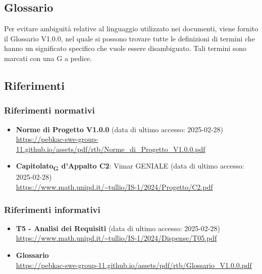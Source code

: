 \subsection{Glossario}
Per evitare ambiguità relative al linguaggio utilizzato nei documenti, viene fornito il Glossario V1.0.0, nel quale si possono trovare tutte le definizioni di termini che hanno un significato specifico che vuole essere disambiguato. Tali termini sono marcati con una G a pedice.
\subsection{Riferimenti}
\subsubsection{Riferimenti  normativi}  
\begin{itemize}
    \item \textbf{Norme di Progetto V1.0.0} (data di ultimo accesso: 2025-02-28)\\
    \url{https://pebkac-swe-group-11.github.io/assets/pdf/rtb/Norme_di_Progetto_V1.0.0.pdf} 

    \item \textbf{Capitolato\textsubscript{G} d'Appalto C2}: Vimar GENIALE (data di ultimo accesso: 2025-02-28)\\
    \url{https://www.math.unipd.it/~tullio/IS-1/2024/Progetto/C2.pdf}
\end{itemize}
\subsubsection{Riferimenti informativi}
\begin{itemize}
    \item \textbf{T5 - Analisi dei Requisiti} (data di ultimo accesso: 2025-02-28)\\
    \url{https://www.math.unipd.it/~tullio/IS-1/2024/Dispense/T05.pdf}
    
    \item \textbf{Glossario} \\
    \url{https://pebkac-swe-group-11.github.io/assets/pdf/rtb/Glossario_V1.0.0.pdf}
\end{itemize}
